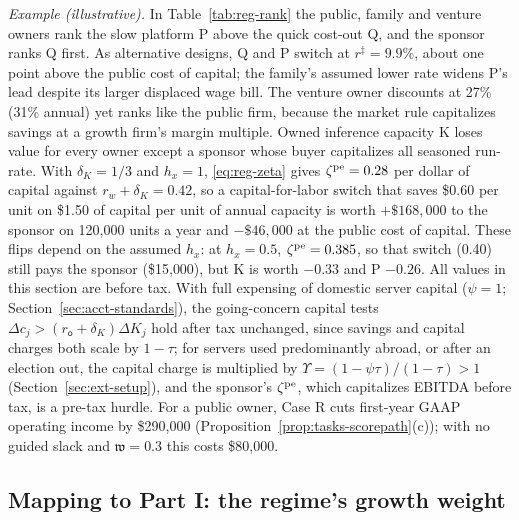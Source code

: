 \noindent\emph{Example (illustrative).} In Table~\ref{tab:reg-rank} the public, family and venture owners rank the slow platform P above the quick cost-out Q, and the sponsor ranks Q first. As alternative designs, Q and P switch at $r^\ddagger=9.9\%$, about one point above the public cost of capital; the family's assumed lower rate widens P's lead despite its larger displaced wage bill. The venture owner discounts at 27\% (31\% annual) yet ranks like the public firm, because the market rule capitalizes savings at a growth firm's margin multiple. Owned inference capacity K loses value for every owner except a sponsor whose buyer capitalizes all seasoned run-rate. With $\delta_K=1/3$ and $h_x=1$, \eqref{eq:reg-zeta} gives $\zeta^{\rm pe}=0.28$ per dollar of capital against $r_w+\delta_K=0.42$, so a capital-for-labor switch that saves \$0.60 per unit on \$1.50 of capital per unit of annual capacity is worth $+\$168{,}000$ to the sponsor on 120{,}000 units a year and $-\$46{,}000$ at the public cost of capital. These flips depend on the assumed $h_x$: at $h_x=0.5$, $\zeta^{\rm pe}=0.385$, so that switch (0.40) still pays the sponsor (\$15{,}000), but K is worth $-0.33$ and P $-0.26$. All values in this section are before tax. With full expensing of domestic server capital ($\psi=1$; Section~\ref{sec:acct-standards}), the going-concern capital tests $\Delta c_j>(r_{\mathsf o}+\delta_K)\Delta K_j$ hold after tax unchanged, since savings and capital charges both scale by $1-\tau$; for servers used predominantly abroad, or after an election out, the capital charge is multiplied by $\Upsilon=(1-\psi\tau)/(1-\tau)>1$ (Section~\ref{sec:ext-setup}), and the sponsor's $\zeta^{\rm pe}$, which capitalizes EBITDA before tax, is a pre-tax hurdle. For a public owner, Case R cuts first-year GAAP operating income by \$290{,}000 (Proposition~\ref{prop:tasks-scorepath}(c)); with no guided slack and $\mathfrak w=0.3$ this costs \$80{,}000.

\subsection{Mapping to Part I: the regime's growth weight}\label{sec:regimes-partI}


